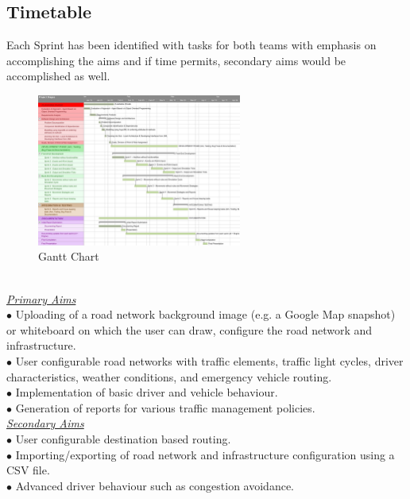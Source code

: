 \documentclass[11pt]{article}
\begin{document}
	\subsection{Timetable}\label{TT}
	Each Sprint has been identified with tasks for both teams with emphasis on accomplishing the aims and if time permits, secondary aims would be accomplished as well. 
		\begin{figure}[h]
		     	\centering
    			\includegraphics[width=0.6\textwidth]{Gantt}
    			\caption{Gantt Chart}
    			\label{fig:GC}
		\end{figure}
	\\
	\underline { \textit{Primary Aims} } \\
		$\bullet$ Uploading of a road network background image (e.g. a Google Map snapshot) or whiteboard on which the user can draw, configure the road network and infrastructure.\\
		$\bullet$ User configurable road networks with traffic elements, traffic light cycles, driver characteristics, weather conditions, and emergency vehicle routing.\\
		$\bullet$  Implementation of basic driver and vehicle behaviour.\\
	 	$\bullet$ Generation of reports for various traffic management policies.
	\\
	\underline { \textit{Secondary Aims} }
	\\
		$\bullet$ User configurable destination based routing.\\
		 $\bullet$ Importing/exporting of road network and infrastructure configuration using a CSV file.\\
		 $\bullet$ Advanced driver behaviour such as congestion avoidance.
\end{document}
